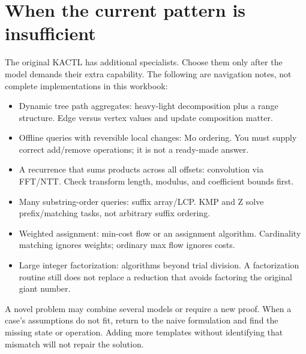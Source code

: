 \section{When the current pattern is insufficient}
The original KACTL has additional specialists. Choose them only after the
model demands their extra capability. The following are navigation notes,
not complete implementations in this workbook:
\begin{itemize}
\item Dynamic tree path aggregates: heavy-light decomposition plus a range
structure. Edge versus vertex values and update composition matter.
\item Offline queries with reversible local changes: Mo ordering. You must
supply correct add/remove operations; it is not a ready-made answer.
\item A recurrence that sums products across all offsets: convolution via
FFT/NTT. Check transform length, modulus, and coefficient bounds first.
\item Many substring-order queries: suffix array/LCP. KMP and Z solve
prefix/matching tasks, not arbitrary suffix ordering.
\item Weighted assignment: min-cost flow or an assignment algorithm.
Cardinality matching ignores weights; ordinary max flow ignores costs.
\item Large integer factorization: algorithms beyond trial division.
A factorization routine still does not replace a reduction that avoids
factoring the original giant number.
\end{itemize}
A novel problem may combine several models or require a new proof. When a
case's assumptions do not fit, return to the naive formulation and find the
missing state or operation. Adding more templates without identifying that
mismatch will not repair the solution.
